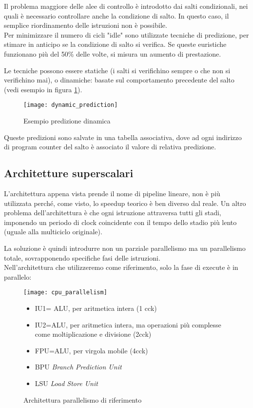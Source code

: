 \documentclass[../template]{subfiles}
\begin{document}
Il problema maggiore delle alee di controllo è introdotto dai salti condizionali, nei quali è necessario controllare anche la condizione di salto.
In questo caso, il semplice riordinamento delle istruzioni non è possibile.
\\
Per minimizzare il numero di cicli "idle" sono utilizzate tecniche di predizione, per stimare in anticipo se la condizione di salto si verifica.
Se queste euristiche funzionano più del 50\% delle volte, si misura un aumento di prestazione.

Le tecniche possono essere statiche (i salti si verifichino sempre o che non si verifichino mai), o dinamiche: basate
sul comportamento precedente del salto (vedi esempio in figura \ref{fig:dynamic_prediction}).

\begin{figure}[h]
    \centering
    \texttt{[image: dynamic\_prediction]}
    \caption{Esempio predizione dinamica}
    \label{fig:dynamic_prediction}
\end{figure}

Queste predizioni sono salvate in una tabella associativa, dove ad ogni indirizzo di program counter del
salto è associato il valore di relativa predizione.

\subsection{Architetture superscalari}
L'architettura appena vista prende il nome di pipeline lineare, non è più utilizzata perché, come visto, lo speedup teorico è ben diverso dal reale.
Un altro problema dell'architettura è che ogni istruzione attraversa tutti gli stadi, imponendo un periodo di clock coincidente con il tempo dello stadio più lento (uguale alla multiciclo originale).

La soluzione è quindi introdurre non un parziale parallelismo ma un parallelismo totale, sovrapponendo specifiche fasi delle istruzioni.
\\
Nell'architettura che utilizzeremo come riferimento, solo la fase di execute è in parallelo:

\begin{figure}[h]
    \begin{minipage}{.5\textwidth}
        \centering
        \texttt{[image: cpu\_parallelism]}
    \end{minipage}
    \begin{minipage}{.45\textwidth}
        \begin{itemize}
            \item IU1= ALU, per aritmetica intera (1 cck)
            \item IU2=ALU, per aritmetica intera, ma operazioni più complesse come moltiplicazione e divisione (2cck)
            \item FPU=ALU, per virgola mobile (4cck)
            \item BPU \textit{Branch Prediction Unit}
            \item LSU \textit{Load Store Unit}
        \end{itemize}
    \end{minipage}
    \caption{Architettura parallelismo di riferimento}
\end{figure}
\end{document}
